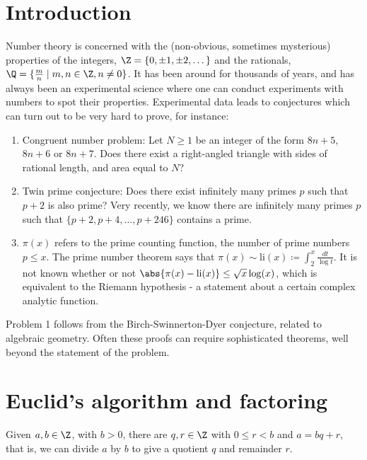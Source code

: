 \documentclass{article}
\begin{document}
\maketitle
\tableofcontents

\clearpage

\section{Introduction}
Number theory is concerned with the (non-obvious, sometimes mysterious) properties of the integers, $\Z = \{0, \pm 1, \pm 2, \dots\}$ and the rationals, $\Q = \{\frac{m}{n} \mid m, n \in \Z, n \ne 0\}$.
It has been around for thousands of years, and has always been an experimental science where one can conduct experiments with numbers to spot their properties. Experimental data leads to conjectures which can turn out to be very hard to prove, for instance:
\begin{enumerate}
    \item Congruent number problem: Let $N \geq 1$ be an integer of the form $8n + 5$, $8n+6$ or $8n + 7$.
        Does there exist a right-angled triangle with sides of rational length, and area equal to $N$?
    \item Twin prime conjecture: Does there exist infinitely many primes $p$ such that $p+2$ is also prime?
        Very recently, we know there are infinitely many primes $p$ such that $\{p+2, p+4, \dots, p+246\}$ contains a prime.
    \item $\pi(x)$ refers to the prime counting function, the number of prime numbers $p \leq x$.
        The prime number theorem says that $\pi(x) \sim \mathrm{li}(x) \coloneqq \int_2^x \frac{dt}{\log t}$.
        It is not known whether or not $\abs{\pi(x) - \mathrm{li}(x)} \leq \sqrt{x} \log(x)$, which is equivalent to the Riemann hypothesis - a statement about a certain complex analytic function.
\end{enumerate}
Problem 1 follows from the Birch-Swinnerton-Dyer conjecture, related to algebraic geometry.
Often these proofs can require sophisticated theorems, well beyond the statement of the problem.
\clearpage

\section{Euclid's algorithm and factoring}
\begin{defi}
    Given $a, b \in \Z$, with $b > 0$, there are $q, r \in \Z$ with $0 \leq r < b$ and $a = b q + r$, that is, we can divide $a$ by $b$ to give a quotient $q$ and remainder $r$.
\end{defi}
\end{document}
